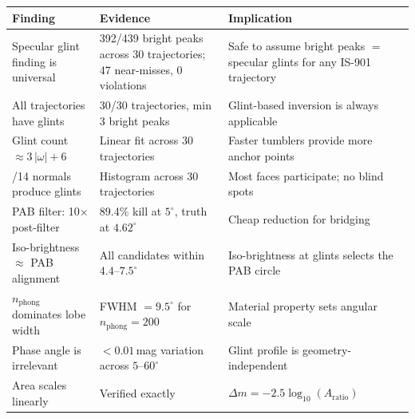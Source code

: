 \documentclass[11pt,a4paper]{article}
\begin{document}
\begin{table}[H]
\centering
\small
\begin{tabular}{p{5cm}p{5cm}p{5cm}}
\toprule
\textbf{Finding} & \textbf{Evidence} & \textbf{Implication} \\
\midrule
Specular glint finding is universal & 392/439 bright peaks across 30 trajectories; 47 near-misses, 0 violations & Safe to assume bright peaks $=$ specular glints for any IS-901 trajectory \\
\addlinespace
All trajectories have glints & 30/30 trajectories, min 3 bright peaks & Glint-based inversion is always applicable \\
\addlinespace
Glint count $\approx 3\,|\omega| + 6$ & Linear fit across 30 trajectories & Faster tumblers provide more anchor points \\
\addlinespace
10/14 normals produce glints & Histogram across 30 trajectories & Most faces participate; no blind spots \\
\addlinespace
PAB filter: 10$\times$ post-filter & 89.4\% kill at $5^\circ$, truth at $4.62^\circ$ & Cheap reduction for bridging \\
\addlinespace
Iso-brightness $\approx$ PAB alignment & All candidates within $4.4$--$7.5^\circ$ & Iso-brightness at glints selects the PAB circle \\
\addlinespace
$n_{\mathrm{phong}}$ dominates lobe width & FWHM $= 9.5^\circ$ for $n_{\mathrm{phong}} = 200$ & Material property sets angular scale \\
\addlinespace
Phase angle is irrelevant & $<0.01$\,mag variation across $5$--$60^\circ$ & Glint profile is geometry-independent \\
\addlinespace
Area scales linearly & Verified exactly & $\Delta m = -2.5\log_{10}(A_{\mathrm{ratio}})$ \\
\bottomrule
\end{tabular}
\end{table}
\end{document}
